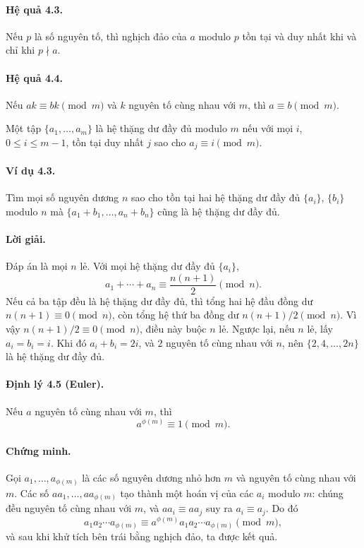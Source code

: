 \documentclass[11pt]{article}
\begin{document}
\paragraph{Hệ quả 4.3.}
Nếu \(p\) là số nguyên tố, thì nghịch đảo của \(a\) modulo \(p\) tồn tại và
duy nhất khi và chỉ khi \(p\nmid a\).

\paragraph{Hệ quả 4.4.}
Nếu \(ak\equiv bk\pmod m\) và \(k\) nguyên tố cùng nhau với \(m\), thì
\(a\equiv b\pmod m\).

Một tập \(\{a_1,\ldots,a_m\}\) là hệ thặng dư đầy đủ modulo \(m\) nếu với mọi
\(i\), \(0\le i\le m-1\), tồn tại duy nhất \(j\) sao cho \(a_j\equiv i\pmod m\).

\paragraph{Ví dụ 4.3.}
Tìm mọi số nguyên dương \(n\) sao cho tồn tại hai hệ thặng dư đầy đủ
\(\{a_i\}\), \(\{b_i\}\) modulo \(n\) mà \(\{a_1+b_1,\ldots,a_n+b_n\}\) cũng
là hệ thặng dư đầy đủ.

\paragraph{Lời giải.}
Đáp án là mọi \(n\) lẻ. Với mọi hệ thặng dư đầy đủ \(\{a_i\}\),
\[
 a_1+\cdots+a_n\equiv\frac{n(n+1)}2\pmod n.
\]
Nếu cả ba tập đều là hệ thặng dư đầy đủ, thì tổng hai hệ đầu đồng dư
\(n(n+1)\equiv0\pmod n\), còn tổng hệ thứ ba đồng dư \(n(n+1)/2\pmod n\).
Vì vậy \(n(n+1)/2\equiv0\pmod n\), điều này buộc \(n\) lẻ. Ngược lại, nếu
\(n\) lẻ, lấy \(a_i=b_i=i\). Khi đó \(a_i+b_i=2i\), và \(2\) nguyên tố cùng
nhau với \(n\), nên \(\{2,4,\ldots,2n\}\) là hệ thặng dư đầy đủ.

\paragraph{Định lý 4.5 (Euler).}
Nếu \(a\) nguyên tố cùng nhau với \(m\), thì
\[
 a^{\phi(m)}\equiv1\pmod m.
\]

\paragraph{Chứng minh.}
Gọi \(a_1,\ldots,a_{\phi(m)}\) là các số nguyên dương nhỏ hơn \(m\) và nguyên
tố cùng nhau với \(m\). Các số \(aa_1,\ldots,aa_{\phi(m)}\) tạo thành một hoán
vị của các \(a_i\) modulo \(m\): chúng đều nguyên tố cùng nhau với \(m\), và
\(aa_i\equiv aa_j\) suy ra \(a_i\equiv a_j\). Do đó
\[
 a_1a_2\cdots a_{\phi(m)}
 \equiv a^{\phi(m)}a_1a_2\cdots a_{\phi(m)}\pmod m,
\]
và sau khi khử tích bên trái bằng nghịch đảo, ta được kết quả.
\end{document}
